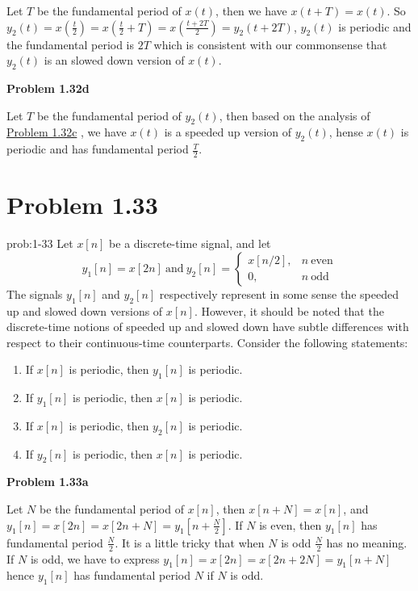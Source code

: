 \documentclass[koma,a4paper,utopia,12pt,listings-color,microtype,paralist,colorlinks,urlcolor=red]{org-article}
\begin{document}
Let \(T\) be the fundamental period of \(x(t)\), then we have \(x(t+T) = x(t)\).
So \(y_{2}(t) = x(\tfrac{t}{2}) = x(\tfrac{t}{2} + T) = x(\frac{t+ 2T}{2})=
y_{2}(t+2T)\), \(y_{2}(t)\) is periodic and the fundamental period is
\(2T\) which is consistent with our commonsense that \(y_{2}(t)\) is an
slowed down version of \(x(t)\).

\textbf{Problem 1.32d}

Let \(T\) be the fundamental period of \(y_{2}(t)\), then based on the analysis
of \hyperref[Problem 1.32c]{Problem 1.32c} , we have \(x(t)\) is a speeded up version of \(y_{2}(t)\),
hense \(x(t)\) is periodic and has fundamental period \(\frac{T}{2}\).
\section{Problem 1.33}
\label{sec:org7dadf9d}


\begin{prob}[]{prob:1-33}
Let \(x[n]\) be a discrete-time signal, and let
\begin{equation*}
y_{1}[n] = x[2n] \ \mathrm{and}\ y_{2}[n] =
\begin{cases}
x[n/2], & n\ \mathrm{even} \\
0, & n\ \mathrm{odd}
\end{cases}
\end{equation*}
The signals \(y_{1}[n]\) and \(y_{2}[n]\) respectively represent in some
sense the speeded  up and slowed down versions of \(x[n]\). However, it
should be noted that the discrete-time notions of speeded up and slowed down
have subtle differences with respect to their continuous-time counterparts.
Consider the following statements:

\begin{enumerate}
\item If \(x[n]\) is periodic, then \(y_{1}[n]\) is periodic.
\item If \(y_{1}[n]\) is periodic, then \(x[n]\) is periodic.
\item If \(x[n]\) is periodic, then \(y_{2}[n]\) is periodic.
\item If \(y_{2}[n]\) is periodic, then \(x[n]\) is periodic.
\end{enumerate}
\label{prob:1-33}
\end{prob}

\textbf{Problem 1.33a}

Let \(N\) be the fundamental period of \(x[n]\), then \(x[n+N] = x[n]\), and
\(y_{1}[n] = x[2n] = x[2n+N] = y_{1}[n+ \frac{N}{2}]\). If \(N\) is even, then
\(y_{1}[n]\) has fundamental period \(\frac{N}{2}\).  It is a little tricky
that when \(N\) is odd \(\frac{N}{2}\) has no meaning. If \(N\) is odd, we have
to express \(y_{1}[n] = x[2n] = x[2n+2N] = y_{1}[n+ N]\) hence \(y_{1}[n]\) has
fundamental period \(N\) if \(N\) is odd.
\end{document}
